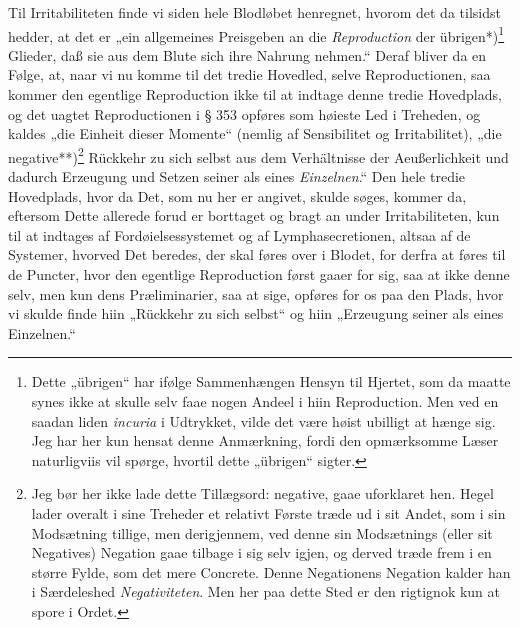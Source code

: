 \documentclass[12pt,a4paper]{book}
\newcommand{\apage}[1]{\marginnote{\footnotesize\textit{[#1]}}}
\begin{document}
Til Irritabiliteten finde vi siden hele Blodløbet henregnet, hvorom det da
tilsidst hedder, at det er „ein allgemeines Preisgeben an die \emph{Reproduction}
der übrigen*)\footnote{Dette „übrigen“ har ifølge Sammenhængen Hensyn til
Hjertet, som da maatte synes ikke at skulle selv faae nogen Andeel i hiin
Reproduction. Men ved en saadan liden \textit{incuria} i Udtrykket, vilde
det være høist ubilligt at hænge sig. Jeg har her kun hensat denne
Anmærkning, fordi den opmærksomme Læser naturligviis vil spørge, hvortil
dette „übrigen“ sigter.} Glieder, daß sie aus dem Blute sich ihre Nahrung
nehmen.“ Deraf bliver da en Følge, at, naar vi nu komme til det tredie
Hovedled, selve Reproductionen, saa kommer den egentlige Reproduction ikke
til at indtage denne tredie Hovedplads, og det uagtet Reproductionen i § 353
opføres som høieste Led i Treheden, og kaldes „die Einheit dieser Momente“
(nemlig af Sensibilitet og Irritabilitet), „die
negative**)\footnote{Jeg bør her ikke lade dette Tillægsord: negative, gaae
uforklaret hen. Hegel lader overalt i sine Treheder et relativt Første træde
ud i sit Andet, som i sin Modsætning tillige, men derigjennem, ved denne sin
Modsætnings (eller sit Negatives) Negation gaae tilbage i sig selv igjen, og
derved træde frem i en større Fylde, som det mere Concrete. Denne
Negationens Negation kalder han i Særdeleshed \emph{Negativiteten}. Men her paa
dette Sted er den rigtignok kun at spore i Ordet.} Rückkehr zu sich selbst
aus dem Verhältnisse der Aeußerlichkeit und dadurch Erzeugung und Setzen
seiner als eines \emph{Einzelnen}.“ Den hele tredie Hovedplads, hvor da Det, som nu
her er angivet, skulde søges, kommer da, eftersom Dette allerede forud er
borttaget og bragt an under Irritabiliteten, kun til at indtages af
\apage{24} Fordøielsessystemet og af Lymphasecretionen, altsaa af de Systemer, hvorved
Det beredes, der skal føres over i Blodet, for derfra at føres til de
Puncter, hvor den egentlige Reproduction først gaaer for sig, saa at ikke
denne selv, men kun dens Præliminarier, saa at sige, opføres for os paa den
Plads, hvor vi skulde finde hiin „Rückkehr zu sich selbst“ og hiin
„Erzeugung seiner als eines Einzelnen.“
\end{document}
